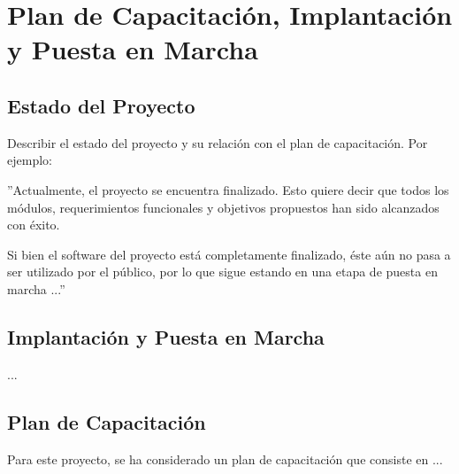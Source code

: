 \chapter{Plan de Capacitación, Implantación y Puesta en Marcha}

\section{Estado del Proyecto}
Describir el estado del proyecto y su relación con el plan de capacitación. Por ejemplo:

''Actualmente, el proyecto se encuentra finalizado. Esto quiere decir que todos los módulos, requerimientos funcionales y objetivos propuestos han sido alcanzados con éxito.

Si bien el software del proyecto está completamente finalizado, éste aún no pasa a ser utilizado por el público, por lo que sigue estando en una etapa de puesta en marcha ...''

\section{Implantación y Puesta en Marcha}
...

\section{Plan de Capacitación}
Para este proyecto, se ha considerado un plan de capacitación que consiste en ...
